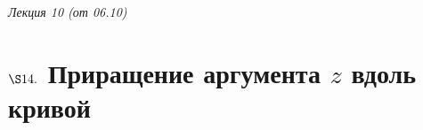 \begin{flushright}
    \textit{Лекция 10 (от 06.10)}
\end{flushright}
\section{$\S 14.$ Приращение аргумента $z$ вдоль кривой}
